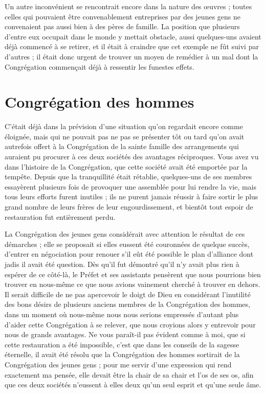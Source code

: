 Un autre inconvénient se rencontrait encore dans la nature des œuvres ; toutes celles qui pouvaient être convenablement entreprises par des jeunes gens ne convenaient pas aussi bien à des pères de famille. La position que plusieurs d'entre eux occupait dans le monde y mettait obstacle, aussi quelques-uns avaient déjà commencé à se retirer, et il était à craindre que cet exemple ne fût suivi par d'autres ; il était donc urgent de trouver un moyen de remédier à un mal dont la Congrégation commençait déjà à ressentir les funestes effets.

\section*{Congrégation des hommes}
C'était déjà dans la prévision d'une situation qu'on regardait encore comme éloignée, mais qui ne pouvait pas ne pas se présenter
tôt ou tard qu'on avait autrefois offert à la Congrégation de la sainte famille des arrangements qui auraient pu procurer à ces deux sociétés des avantages réciproques. Vous avez vu dans l'histoire de la Congrégation, que cette société avait été emportée par la tempête. Depuis que la tranquillité était rétablie, quelques-uns de ses membres essayèrent plusieurs fois de provoquer une assemblée pour lui rendre la vie, mais tous leurs efforts furent inutiles ; ils ne purent jamais réussir à faire sortir le plus grand nombre de leurs frères de leur engourdissement, et bientôt tout espoir de restauration fut entièrement perdu.

La Congrégation des jeunes gens considérait avec attention le résultat de ces démarches ; elle se proposait si elles eussent été couronnées de quelque succès, d'entrer en négociation pour renouer s'il eût été possible le plan d'alliance dont jadis il avait été question. Dès qu'il fut démontré qu'il n'y avait plus rien à espérer de ce côté-là, le Préfet et ses assistants pensèrent que nous pourrions bien trouver en nous-même ce que nous avions vainement cherché à trouver en dehors. Il serait difficile de ne pas apercevoir le doigt de Dieu en considérant l'inutilité des bons désirs de plusieurs anciens membres de la Congrégation des hommes, dans un moment où nous-même nous nous serions empressés d'autant plus d'aider cette Congrégation à se relever, que nous croyions alors y entrevoir pour nous de grands avantages. Ne vous paraît-il pas évident comme à moi, que si cette restauration a été impossible, c'est que dans les conseils de la sagesse éternelle, il avait été résolu
que la Congrégation des hommes sortirait de la Congrégation des jeunes gens ; pour me servir d'une expression qui rend exactement ma pensée, elle devait être la chair de sa chair et l'os de ses os, afin que ces deux sociétés n'eussent à elles deux qu'un seul esprit et qu'une seule âme.

